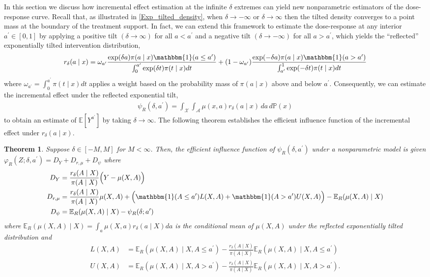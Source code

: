 \documentclass[11pt,twoside]{article}
\newtheorem{theorem}{Theorem}
\theoremstyle{definition}
\theoremstyle{remark}
\begin{document}
In this section we discuss how incremental effect estimation at the infinite $\delta$ extremes can yield new nonparametric estimators of the dose-response curve. Recall that, as illustrated in \cref{Exp_tilted_density}, when $\delta \to -\infty$ or $\delta \to \infty$ then the tilted density converges to a point mass at the boundary of the treatment support. In fact, we can extend this framework to estimate the dose-response at any interior $a^\prime \in [0, 1]$ by applying a positive tilt $(\delta \to \infty)$ for all $a < a^\prime$ and a negative tilt $(\delta \to -\infty)$ for all $a > a^\prime$, which yields the ``reflected'' exponentially tilted intervention distribution,
\begin{align*}
    r_\delta(a \mid x) =  \omega_{a^\prime}\frac{\text{exp}(\delta a) \pi(a \mid x) \mathbbm{1}(a \leq a^\prime) }{\int^{a^\prime}_0 \text{exp}(\delta t) \pi(t \mid x) dt} +  (1-\omega_{a^\prime})\frac{\text{exp}(-\delta a) \pi(a \mid x) \mathbbm{1}(a > a^\prime)}{\int^{1}_{a^\prime} \text{exp}(-\delta t) \pi(t \mid x) dt}
\end{align*}
where $\omega_{a^\prime} = \int^{a^{\prime}}_0 \pi(t \mid x) dt$ applies a weight based on the probability mass of $\pi(a \mid x)$ above and below $a^\prime$. Consequently, we can estimate the incremental effect under the reflected exponential tilt,
\begin{align*}
    \psi_R(\delta, a^\prime) =  \int_\mathcal{X} \int_\mathcal{A} \mu(x, a) r_\delta(a \mid x) \, da \, d\mathbb{P}(x)
\end{align*}
to obtain an estimate of $\mathbb{E}[Y^{a^\prime}]$ by taking $\delta \to \infty$. The following theorem establishes the efficient influence function of the incremental effect under $r_\delta(a \mid x)$.
\begin{theorem} \label{reflected_eif}
    Suppose $\delta \in [-M,M]$ for $M<\infty$. Then, the efficient influence function of $\psi_R(\delta, a^\prime)$ under a nonparametric model is given $\varphi_R(Z;\delta, a^\prime) = D_Y + D_{r, \mu} + D_\psi$ where
\begin{align*}
    D_Y &= \frac{r_\delta(A \mid X)}{\pi(A \mid X)} \Big(Y - \mu(X, A) \Big) \\
    D_{r, \mu} &= \frac{r_\delta(A \mid X)}{\pi(A \mid X)} \mu(X, A) + \Big(\mathbbm{1}(A \leq a^\prime)L(X, A) + \mathbbm{1}(A > a^\prime) U(X, A) \Big) - \mathbb{E}_R(\mu(X, A) \mid X) \\
    D_\psi &= \mathbb{E}_R(\mu(X, A) \mid X)  - \psi_R(\delta; a^\prime)
\end{align*}
where $\mathbb{E}_R(\mu(X, A) \mid X) = \int_a \mu(X, a) r_\delta(a \mid X) da$ is the conditional mean of $\mu(X, A)$ under the reflected exponentially tilted distribution and
\begin{align*}
    L(X, A) &= \mathbb{E}_R(\mu(X, A) \mid X, A \leq a^\prime) - \frac{r_\delta(A \mid X)}{\pi(A \mid X)} \mathbb{E}_R(\mu(X, A) \mid X, A \leq a^\prime) \\
    U(X, A) &= \mathbb{E}_R(\mu(X, A) \mid X, A > a^\prime) - \frac{r_\delta(A \mid X)}{\pi(A \mid X)} \mathbb{E}_R(\mu(X, A) \mid X, A > a^\prime).
\end{align*}
\end{theorem}
\end{document}
